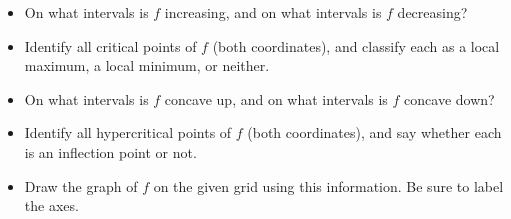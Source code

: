 \begin{itemize}
\item On what intervals is $f$ increasing, and on what intervals is $f$ decreasing?
\item Identify all critical points of $f$ (both coordinates), and classify each as a local maximum, a local minimum, or neither.
\item On what intervals is $f$ concave up, and on what intervals is $f$ concave down?
\item Identify all hypercritical points of $f$ (both coordinates), and say whether each is an inflection point or not.
\item Draw the graph of $f$ on the given grid using this information.
 Be sure to label the axes.
\end{itemize}

\bigskip
\GraphingGrid

